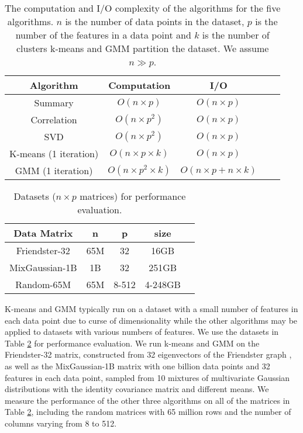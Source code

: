 \begin{table}
\begin{center}
\footnotesize
\begin{tabular}{|c|c|c|c|c|}
\hline
Algorithm & Computation & I/O \\
\hline
Summary & $O(n \times p)$ & $O(n \times p)$ \\
\hline
Correlation & $O(n \times p^2)$ & $O(n \times p)$ \\
\hline
SVD & $O(n \times p^2)$ & $O(n \times p)$ \\
\hline
K-means (1 iteration) & $O(n \times p \times k)$ & $O(n \times p)$ \\
\hline
GMM (1 iteration) & $O(n \times p^2 \times k)$ & $O(n \times p + n \times k)$ \\
\hline
\end{tabular}
\normalsize
\end{center}
\caption{The computation and I/O complexity of the algorithms for the five
	algorithms. $n$ is the number of data points in the dataset, $p$ is
	the number of the features in a data point and $k$ is the number of
clusters k-means and GMM partition the dataset. We assume $n \gg p$.}
\label{tbl:algs}
\end{table}

\begin{table}
\begin{center}
\footnotesize
\begin{tabular}{|c|c|c|c|c|}
\hline
Data Matrix & n & p & size \\
\hline
Friendster-32 \cite{friendster} & 65M & 32 & 16GB \\
\hline
MixGaussian-1B & 1B & 32 & 251GB \\
\hline
Random-65M & 65M & 8-512 & 4-248GB \\
\hline
\end{tabular}
\normalsize
\end{center}
\caption{Datasets ($n \times p$ matrices) for performance evaluation.}
\label{tbl:data}
\end{table}

K-means and GMM typically run on a dataset with a small number of features
in each data point
due to curse of dimensionality \cite{Jain00} while the other algorithms may
be applied to datasets with various numbers of features. We use the datasets
in Table \ref{tbl:data} for performance evaluation. We run k-means and GMM on
the Friendster-32 matrix, constructed from 32 eigenvectors of the Friendster
graph \cite{friendster}, as well as the MixGaussian-1B matrix with one billion
data points and 32 features in each data point, sampled from 10 mixtures of
multivariate Gaussian distributions
with the identity covariance matrix and different means. We measure the performance
of the other three algorithms on all of the matrices in Table \ref{tbl:data},
including the random matrices with 65 million rows and the number of columns
varying from 8 to 512.

